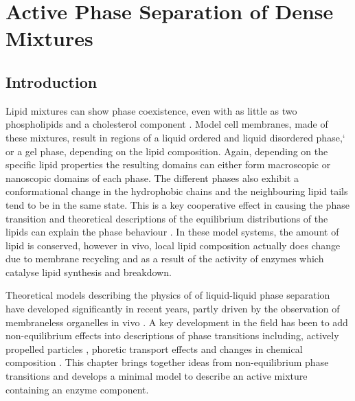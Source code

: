 

\chapter{\label{ch:2-draft}Active Phase Separation of Dense Mixtures}

\minitoc

\section{Introduction}

Lipid mixtures can show phase coexistence, even with as little as two phospholipids and a cholesterol component \cite{feigenson_phase_2009}. Model cell membranes, made of these mixtures, result in regions of a liquid ordered and liquid disordered phase,` or a gel phase, depending on the lipid composition. Again, depending on the specific lipid properties the resulting domains can either form macroscopic or nanoscopic domains of each phase. The different phases also exhibit a conformational change in the hydrophobic chains and the neighbouring lipid tails tend to be in the same state. This is a key cooperative effect in causing the phase transition and theoretical descriptions of the equilibrium distributions of the lipids can explain the phase behaviour \cite{wolff_thermodynamic_2011}. In these model systems, the amount of lipid is conserved, however in vivo, local lipid composition actually does change due to membrane recycling and as a result of the activity of enzymes which catalyse lipid synthesis and breakdown.

Theoretical models describing the physics of of liquid-liquid phase separation have developed significantly in recent years, partly driven by the observation of membraneless organelles in vivo \cite{shin_liquid_2017}. A key development in the field has been to add non-equilibrium effects into descriptions of phase transitions including, actively propelled particles \cite{cates_motility-induced_2015}, phoretic transport effects \cite{agudo-canalejo_active_2019} and changes in chemical composition \cite{weber_drops_2021, li_non-equilibrium_2020}. This chapter brings together ideas from non-equilibrium phase transitions and develops a minimal model to describe an active mixture containing an enzyme component.

